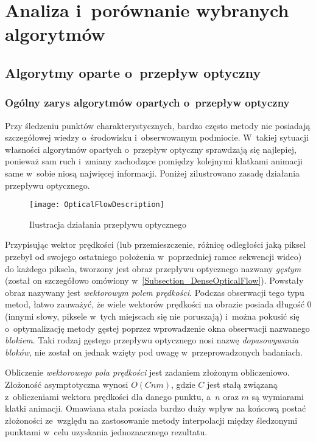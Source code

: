 \chapter{Analiza i~porównanie wybranych algorytmów}\label{Section_Algorytmy}

  \section{Algorytmy oparte o~przepływ optyczny}\label{Subsection_OpticalFlow}

    \subsection{Ogólny zarys algorytmów opartych o~przepływ optyczny}
    Przy śledzeniu punktów charakterystycznych, bardzo często metody nie posiadają szczegółowej wiedzy o~środowisku i~obserwowanym podmiocie. W~takiej sytuacji własności algorytmów opartych o~przepływ optyczny sprawdzają się najlepiej, ponieważ sam ruch i~zmiany zachodzące pomiędzy kolejnymi klatkami animacji same w~sobie niosą najwięcej informacji\cite{OpticalFlowNonPriori05}. Poniżej zilustrowano zasadę działania przepływu optycznego.

    \begin{figure}[!ht]
      \centering
      \texttt{[image: OpticalFlowDescription]}
      \caption[Ilustracja działania przepływu optycznego]{Ilustracja działania przepływu optycznego}
      \label{fig:OpticalFlowDescription}
    \end{figure}

    Przypisując wektor prędkości (lub przemieszczenie, różnicę odległości jaką piksel przebył od swojego ostatniego położenia w~poprzedniej ramce sekwencji wideo) do każdego piksela, tworzony jest obraz przepływu optycznego nazwany \textit{gęstym} (został on szczegółowo omówiony w~\ref{Subsection_DenseOpticalFlow}). Powstały obraz nazywany jest \textit{wektorowym polem prędkości}. Podczas obserwacji tego typu metod, łatwo zauważyć, że wiele wektorów prędkości na obrazie posiada długość $0$ (innymi słowy, piksele w~tych miejscach się nie poruszają) i~można pokusić się o~optymalizację metody gęstej poprzez wprowadzenie okna obserwacji nazwanego \textit{blokiem}. Taki rodzaj gęstego przepływu optycznego nosi nazwę \textit{dopasowywania bloków}, nie został on jednak wzięty pod uwagę w~przeprowadzonych badaniach.

    Obliczenie \textit{wektorowego pola prędkości} jest zadaniem złożonym obliczeniowo. Złożoność asymptotyczna wynosi $O(Cnm)$, gdzie $C$ jest stałą związaną z~obliczeniami wektora prędkości dla danego punktu, a~$n$ oraz $m$ są wymiarami klatki animacji. Omawiana stała posiada bardzo duży wpływ na końcową postać złożoności ze~względu na zastosowanie metody interpolacji między śledzonymi punktami w~celu uzyskania jednoznacznego rezultatu.

